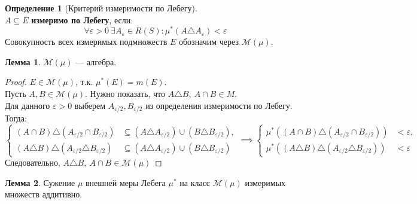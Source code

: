 \documentclass[11pt,a4paper]{report}
\def\eps{\varepsilon}
\theoremstyle{definition}
\theoremstyle{definition}
\newtheorem{lemma}{Лемма}[section]
\theoremstyle{definition}
\newtheorem{definition}{Определение}[section]
\begin{document}
	\begin{definition}[Критерий измеримости по Лебегу]$  $\\
		$ A \subseteq E $ \textbf{измеримо по Лебегу}, если: 
		\[ \forall \eps > 0\ \exists A_{\eps} \in R(S): \mu^{*}(A \triangle A_{\eps}) < \eps \] 
		Совокупность всех измеримых подмножеств $ E $ обозначим через $ \mathcal{M}(\mu) $. 
	\end{definition}
	\begin{lemma}
		$ \mathcal{M}(\mu) $ — алгебра.
	\end{lemma}
	\begin{proof}
		$ E \in \mathcal{M}(\mu) $, т.к. $ \mu^{*}(E) = m(E) $.\\ 
		Пусть $ A, B \in \mathcal{M}(\mu) $. Нужно показать, что $ A \triangle B,\ A \cap B \in M $.\\
		Для данного $ \eps > 0 $ выберем $ A_{\eps/2}, B_{\eps/2} $ из определения измеримости по Лебегу. Тогда:\\ 
		\[ 
			\begin{cases}
				(A \cap B) \triangle (A_{\eps/2} \cap B_{\eps/2}) &\subseteq (A \triangle A_{\eps/2}) \cup (B \triangle B_{\eps/2}),\\
				(A \triangle B) \triangle (A_{\eps/2} \triangle B_{\eps/2}) &\subseteq (A \triangle A_{\eps/2}) \cup (B \triangle B_{\eps/2})
			\end{cases} \implies 
			\begin{cases}
				\mu^{*}((A \cap B) \triangle (A_{\eps/2} \cap B_{\eps/2})) &< \eps,\\
				\mu^{*}((A \triangle B) \triangle (A_{\eps/2} \triangle B_{\eps/2})) &< \eps
			\end{cases}
		\]
		Следовательно, $ A \triangle B,\ A \cap B \in \mathcal{M}(\mu) $
	\end{proof}
	\begin{lemma}
		Сужение $ \mu $ внешней меры Лебега $ \mu^{*} $ на класс $ \mathcal{M}(\mu) $ измеримых множеств аддитивно.
	\end{lemma}
\end{document}
